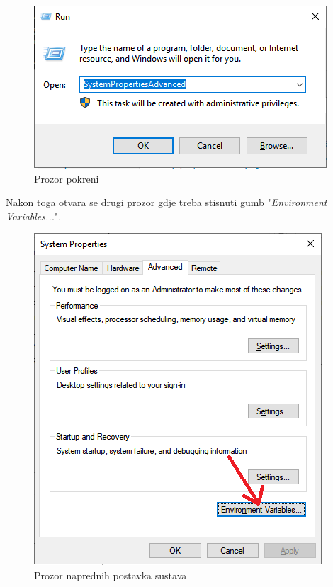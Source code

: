 			\begin{figure}[H]
			\centering
			\includegraphics[width=\textwidth, scale=0.5]{slike/RunWindow}
			\caption{Prozor pokreni}
			\label{fig:RunWindow}
			\end{figure}
			
			Nakon toga otvara se drugi prozor gdje treba stisnuti gumb "\textit{Environment Variables...}".
			
			\begin{figure}[H]
			\centering
			\includegraphics[width=\textwidth, scale=0.5]{slike/SystemPropertiesAdvanced}
			\caption{Prozor naprednih postavka sustava}
			\label{fig:SystemPropertiesAdvanced}
			\end{figure}
			
